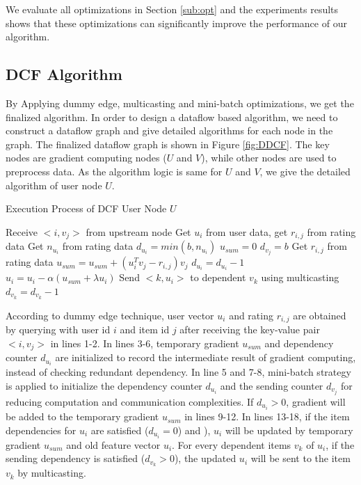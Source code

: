 \documentclass{llncs}
\begin{document}
We evaluate all optimizations in Section \ref{sub:opt} and the experiments results shows that these optimizations can significantly improve the performance of our algorithm.

\vspace{-15pt}
\subsection{DCF Algorithm}
\vspace{-5pt}
By Applying dummy edge, multicasting and mini-batch optimizations, we get the finalized algorithm. In order to design a dataflow based algorithm, we need to construct a dataflow graph and give detailed algorithms for each node in the graph. The finalized dataflow graph is shown in Figure \ref{fig:DDCF}. The key nodes are gradient computing nodes ($U$ and $V$), while other nodes are used to preprocess data. As the algorithm logic is same for $U$ and $V$, we give the detailed algorithm of user node $U$.

\begin{algorithm}
\caption{Execution Process of DCF User Node $U$}
\label{code:DCF}
\begin{algorithmic}[1]
\STATE Receive $<i, v_j>$ from upstream node
\STATE Get $u_i$ from user data, get $r_{i,j}$ from rating data
\STATE Get $n_{u_i}$ from rating data
\STATE $d_{u_i} = min(b,n_{u_i})$
\STATE $u_{sum} = 0$
\ENDIF
{}
\STATE $d_{v_j} = b$
\ENDIF
{}
\STATE Get $r_{i,j}$ from rating data
\STATE $u_{sum} = u_{sum} + (u_i^T v_j - r_{i,j})v_j$
\STATE $d_{u_i} = d_{u_i} - 1$
\ENDIF
{}
\STATE $u_i = u_i - \alpha (u_{sum} + \lambda u_i)$
\STATE Send $<k, u_i>$ to dependent $v_k$ using multicasting
\STATE $d_{v_k} = d_{v_k} - 1$
\ENDIF
\ENDFOR
\ENDIF
\end{algorithmic}
\end{algorithm}


According to dummy edge technique, user vector $u_i$ and rating $r_{i,j}$ are obtained by querying with user id $i$ and item id $j$ after receiving the key-value pair $<i, v_j>$ in lines 1-2. In lines 3-6, temporary gradient $u_{sum}$ and dependency counter $d_{u_i}$ are initialized to record the intermediate result of gradient computing, instead of checking redundant dependency. In line 5 and 7-8, mini-batch strategy is applied to initialize the dependency counter $d_{u_i}$ and the sending counter $d_{v_j}$ for reducing computation and communication complexities. If $d_{u_i} > 0$, gradient will be added to the temporary gradient $u_{sum}$ in lines 9-12. In lines 13-18, if the item dependencies for $u_i$ are satisfied ($d_{u_i} = 0$) and ), $u_i$ will be updated by temporary gradient $u_{sum}$ and old feature vector $u_i$. For every dependent items $v_k$ of $u_i$, if the sending dependency is satisfied ($d_{v_k} > 0$), the updated $u_i$ will be sent to the item $v_k$ by multicasting.
%
\vspace{-10pt}
\end{document}
